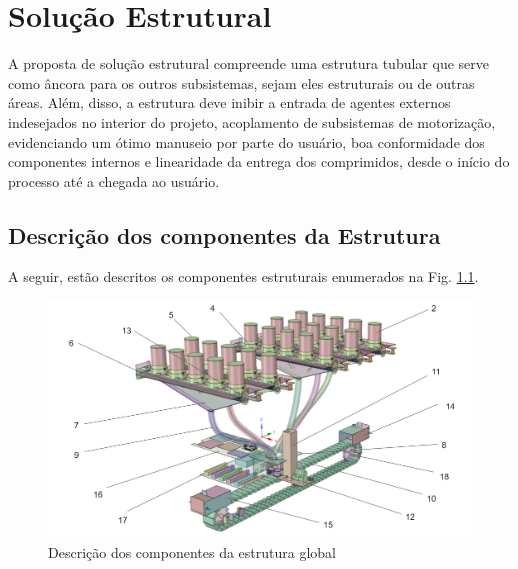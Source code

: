 \chapter[Solução Estrutural]{Solução Estrutural}

A proposta de solução estrutural compreende uma estrutura tubular que serve como âncora para os outros subsistemas, sejam eles estruturais ou de outras áreas. Além, disso, a estrutura deve inibir a entrada de agentes externos indesejados no interior do projeto, acoplamento de subsistemas de motorização, evidenciando um ótimo manuseio por parte do usuário, boa conformidade dos componentes internos e linearidade da entrega dos comprimidos, desde o início do processo até a chegada ao usuário.


\section{Descrição dos componentes da Estrutura}

A seguir, estão descritos os componentes estruturais enumerados na Fig. \ref{fig:Descrição_Global}.

\begin{figure}[ht]
        \centering
        \includegraphics[width=1\textwidth]{figuras/estrutura/Design/descricao_estrutura.png}
        \caption{Descrição dos componentes da estrutura global}
        \label{fig:Descrição_Global}
    \end{figure}

